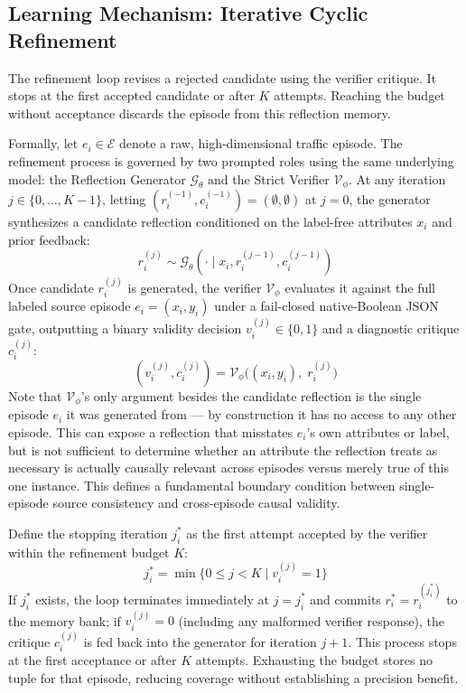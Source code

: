 \documentclass[journal]{IEEEtran}
\theoremstyle{definition}
\theoremstyle{remark}
\begin{document}
\subsection{Learning Mechanism: Iterative Cyclic Refinement}
The refinement loop revises a rejected candidate using the verifier critique. It stops at the first accepted candidate or after $K$ attempts. Reaching the budget without acceptance discards the episode from this reflection memory.

Formally, let $e_i \in \mathcal{E}$ denote a raw, high-dimensional traffic episode. The refinement process is governed by two prompted roles using the same underlying model: the Reflection Generator $\mathcal{G}_\theta$ and the Strict Verifier $\mathcal{V}_\phi$. At any iteration $j \in \{0,\ldots,K-1\}$, letting $(r_i^{(-1)}, c_i^{(-1)}) = (\emptyset, \emptyset)$ at $j=0$, the generator synthesizes a candidate reflection conditioned on the label-free attributes $x_i$ and prior feedback:
\begin{equation}
    r_i^{(j)} \sim \mathcal{G}_\theta(\cdot \mid x_i, r_i^{(j-1)}, c_i^{(j-1)})
\end{equation}
Once candidate $r_i^{(j)}$ is generated, the verifier $\mathcal{V}_\phi$ evaluates it against the full labeled source episode $e_i = (x_i, y_i)$ under a fail-closed native-Boolean JSON gate, outputting a binary validity decision $v_i^{(j)} \in \{0, 1\}$ and a diagnostic critique $c_i^{(j)}$:
\begin{equation}
    (v_i^{(j)}, c_i^{(j)}) = \mathcal{V}_\phi\big((x_i, y_i),\; r_i^{(j)}\big)
    \label{eq:verifier}
\end{equation}
Note that $\mathcal{V}_\phi$'s only argument besides the candidate reflection is the single episode $e_i$ it was generated from --- by construction it has no access to any other episode. This can expose a reflection that misstates $e_i$'s own attributes or label, but is not sufficient to determine whether an attribute the reflection treats as necessary is actually causally relevant across episodes versus merely true of this one instance. This defines a fundamental boundary condition between single-episode source consistency and cross-episode causal validity.

Define the stopping iteration $j_i^*$ as the first attempt accepted by the verifier within the refinement budget $K$:
\begin{equation}
    j_i^* = \min\big\{0 \le j < K \;\big|\; v_i^{(j)} = 1\big\}
\end{equation}
If $j_i^*$ exists, the loop terminates immediately at $j = j_i^*$ and commits $r_i^* = r_i^{(j_i^*)}$ to the memory bank; if $v_i^{(j)} = 0$ (including any malformed verifier response), the critique $c_i^{(j)}$ is fed back into the generator for iteration $j+1$.
This process stops at the first acceptance or after $K$ attempts. Exhausting the budget stores no tuple for that episode, reducing coverage without establishing a precision benefit.
\end{document}
